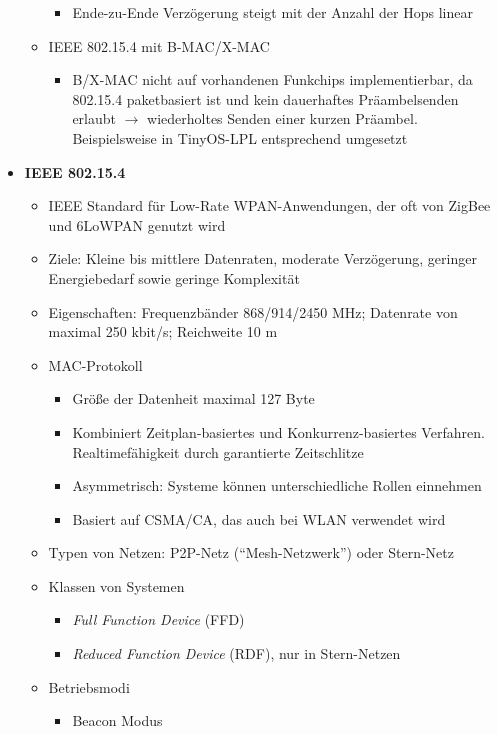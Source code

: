 \begin{itemize}
\begin{itemize}
\begin{itemize}
			\item Ende-zu-Ende Verzögerung steigt mit der Anzahl der Hops linear
		\end{itemize}
		\item IEEE 802.15.4 mit B-MAC/X-MAC
		\begin{itemize}
			\item B/X-MAC nicht auf vorhandenen Funkchips implementierbar, da 802.15.4 paketbasiert ist und kein dauerhaftes Präambelsenden erlaubt \(\rightarrow\) wiederholtes Senden einer kurzen Präambel. Beispielsweise in TinyOS-LPL entsprechend umgesetzt
		\end{itemize}
	\end{itemize}
	\item \textbf{IEEE 802.15.4}
	\begin{itemize}
		\item IEEE Standard für Low-Rate WPAN-Anwendungen, der oft von ZigBee und 6LoWPAN genutzt wird
		\item Ziele: Kleine bis mittlere Datenraten, moderate Verzögerung, geringer Energiebedarf sowie geringe Komplexität
		\item Eigenschaften: Frequenzbänder 868/914/2450 MHz; Datenrate von maximal 250 kbit/s; Reichweite 10 m
		\item MAC-Protokoll
		\begin{itemize}
			\item Größe der Datenheit maximal 127 Byte
			\item Kombiniert Zeitplan-basiertes und Konkurrenz-basiertes Verfahren. Realtimefähigkeit durch garantierte Zeitschlitze
			\item Asymmetrisch: Systeme können unterschiedliche Rollen einnehmen
			\item Basiert auf CSMA/CA, das auch bei WLAN verwendet wird
		\end{itemize}
		\item Typen von Netzen: P2P-Netz ("`Mesh-Netzwerk"') oder Stern-Netz
		\item Klassen von Systemen
		\begin{itemize}
			\item \textit{Full Function Device} (FFD)
			\item \textit{Reduced Function Device} (RDF), nur in Stern-Netzen
		\end{itemize}
		\item Betriebsmodi
		\begin{itemize}
			\item Beacon Modus
			\begin{itemize}

\end{itemize}
\end{itemize}
\end{itemize}
\end{itemize}
